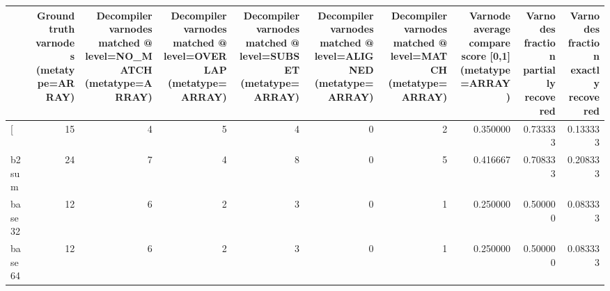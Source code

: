 \begin{tabular}{lrrrrrrrrr}
\toprule
{} &  Ground truth varnodes (metatype=ARRAY) &  Decompiler varnodes matched @ level=NO\_MATCH (metatype=ARRAY) &  Decompiler varnodes matched @ level=OVERLAP (metatype=ARRAY) &  Decompiler varnodes matched @ level=SUBSET (metatype=ARRAY) &  Decompiler varnodes matched @ level=ALIGNED (metatype=ARRAY) &  Decompiler varnodes matched @ level=MATCH (metatype=ARRAY) &  Varnode average compare score [0,1] (metatype=ARRAY) &  Varnodes fraction partially recovered &  Varnodes fraction exactly recovered \\
\midrule
[         &                                      15 &                                                  4 &                                                  5 &                                                  4 &                                                  0 &                                                  2 &                                           0.350000 &                               0.733333 &                             0.133333 \\
b2sum     &                                      24 &                                                  7 &                                                  4 &                                                  8 &                                                  0 &                                                  5 &                                           0.416667 &                               0.708333 &                             0.208333 \\
base32    &                                      12 &                                                  6 &                                                  2 &                                                  3 &                                                  0 &                                                  1 &                                           0.250000 &                               0.500000 &                             0.083333 \\
base64    &                                      12 &                                                  6 &                                                  2 &                                                  3 &                                                  0 &                                                  1 &                                           0.250000 &                               0.500000 &                             0.083333 \\

\end{tabular}
